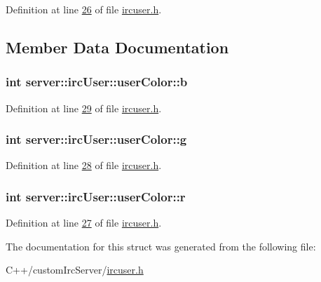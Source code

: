 Definition at line \hyperlink{custom_irc_server_2ircuser_8h_source_l00026}{26} of file \hyperlink{custom_irc_server_2ircuser_8h_source}{ircuser.\-h}.



\subsection{Member Data Documentation}
\hypertarget{structserver_1_1irc_user_1_1user_color_a908b1b071395653458048d5b84de460f}{
\subsubsection[{b}]{\setlength{\rightskip}{0pt plus 5cm}int server\-::irc\-User\-::user\-Color\-::b}}\label{db/d31/structserver_1_1irc_user_1_1user_color_a908b1b071395653458048d5b84de460f}


Definition at line \hyperlink{custom_irc_server_2ircuser_8h_source_l00029}{29} of file \hyperlink{custom_irc_server_2ircuser_8h_source}{ircuser.\-h}.

\hypertarget{structserver_1_1irc_user_1_1user_color_ab72c5a2e0c09cd2ea5ef195cb4edd3ae}{
\subsubsection[{g}]{\setlength{\rightskip}{0pt plus 5cm}int server\-::irc\-User\-::user\-Color\-::g}}\label{db/d31/structserver_1_1irc_user_1_1user_color_ab72c5a2e0c09cd2ea5ef195cb4edd3ae}


Definition at line \hyperlink{custom_irc_server_2ircuser_8h_source_l00028}{28} of file \hyperlink{custom_irc_server_2ircuser_8h_source}{ircuser.\-h}.

\hypertarget{structserver_1_1irc_user_1_1user_color_abe837948b8877eb7faa9b229037b3af2}{
\subsubsection[{r}]{\setlength{\rightskip}{0pt plus 5cm}int server\-::irc\-User\-::user\-Color\-::r}}\label{db/d31/structserver_1_1irc_user_1_1user_color_abe837948b8877eb7faa9b229037b3af2}


Definition at line \hyperlink{custom_irc_server_2ircuser_8h_source_l00027}{27} of file \hyperlink{custom_irc_server_2ircuser_8h_source}{ircuser.\-h}.



The documentation for this struct was generated from the following file\-:\begin{DoxyCompactItemize}
\item 
C++/custom\-Irc\-Server/\hyperlink{custom_irc_server_2ircuser_8h}{ircuser.\-h}\end{DoxyCompactItemize}
